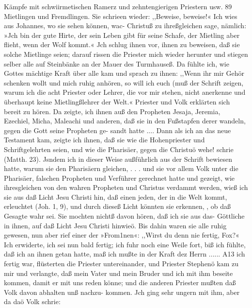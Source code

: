 Kämpfe mit schwiirmetischen Ramerz und zehntengierigen Priestern usw. 89
Mietlingen und Fremdlingen. Sie schrieen wieder: ,,Beweise,
beweise!« Ich wies aus Johannes, wo sie sehen können, wac-
Christuß zu ihreßgleichen sage, nämlich: »Jch bin der gute Hirte,
der sein Leben gibt für seine Schafe, der Mietling aber flieht,
wenn der Wolf kommt.« Jch schlug ihnen vor, ihnen zu beweisen,
daß sie solche Mietlinge seien; darauf rissen die Priester mich
wieder herunter und stiegen selber alle auf Steinbänke
an der Mauer des Turmhauseß. Da fühlte ich, wie Gottes
mächtige Kraft über alle kam und sprach zu ihnen: ,,Wenn ihr
mir Gehör schenken wollt und mich ruhig anhören, so will ich
euch (muß der Schrift zeigen, warum ich die acht Priester oder
Lehrer, die vor mir stehen, nicht anerkenne und überhaupt keine
Mietlingßlehrer der Welt.« Priester und Volk erklärten sich bereit
zu hören. Da zeigte, ich ihnen auß den Propheten Jesaja,
Jeremia, Ezechiel, Micha, Maleachi und anderen, daß sie in den
Fußstapfen derer wandeln, gegen die Gott seine Propheten ge-
sandt hatte ....
Dann als ich an das neue Testament kam, zeigte ich ihnen,
daß sie wie die Hohenpriester und Schriftgelehrten seien, und
wie die Pharisäer, gegen die Christuö wehe! schrie (Matth. 23).
Jsndem ich in dieser Weise außführlich aus der Schrift bewiesen
hatte, warum sie den Pharisäern gleichen, . . . und sie vor allem
Volk unter die Pharisäer, falschen Propheten und Verführer
gerechnet hatte und gezeigt, wie ihresgleichen von den wahren
Propheten und Christus verdammt werden, wieß ich sie aus daß
Licht Jesu Christi hin, daß einen jeden, der in die Welt kommt,
erleuchtet (Joh. 1, 9), und durch dieseß Licht könnten sie erkennen,
, ob daß Gesagte wahr sei. Sie mochten nichtß davon hören, daß
ich sie aus das- Göttliche in ihnen, auf daß Licht Jesu Christi
hinwieö. Bis dahin waren sie alle ruhig gewesen, nun aber
rief einer der »From1nen«: ,,Wirst du denn nie fertig, Fox?«
Ich erwiderte, ich sei nun bald fertig; ich fuhr noch eine Weile
fort, biß ich fühlte, daß ich an ihnen getan hatte, maß ich mußte
in der Kraft dez Herrn ...... A13 ich fertig war, flüsterten
die Priester untereinander, und Priester Stephenö kam zu mir
und verlangte, daß mein Vater und mein Bruder und ich mit
ihm beseite kommen, damit er mit uns reden könne; und die
anderen Priester mußten daß Volk davon abhalten unß nachzu-
kommen. Jch ging sehr ungern mit ihm, aber da daö Volk schrie:



